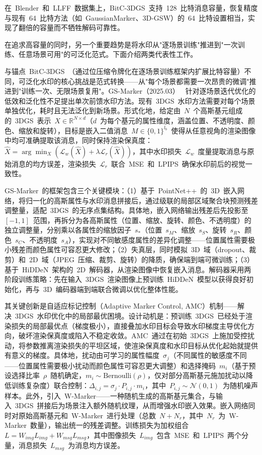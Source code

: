 在~Blender~和~LLFF~数据集上，BitC-3DGS~支持~128~比特消息容量，恢复精度与现有~64~比特方法（如~GaussianMarker、3D-GSW）的~64~比特设置相当，实现了翻倍的容量而不牺牲解码可靠性。

在追求高容量的同时，另一个重要趋势是将水印从"逐场景训练"推进到"一次训练、任意场景可用"的可泛化范式。下面介绍两类代表性工作。

与锚点~BitC-3DGS~（通过位压缩令牌化在逐场景训练框架内扩展比特容量）不同，可泛化水印的核心挑战是范式转换——从"每个场景都需要一次昂贵的微调"推进到"训练一次、无限场景复用"。GS-Marker（2025.03）~\cite{2503_18718} 针对逐场景迭代优化的低效和泛化性不足提出单次前馈水印方法。现有~3DGS~水印方法需要对每个场景单独优化，耗时且无法泛化到新场景。形式化地，给定由~$N$~个高斯基元组成的~3DGS~表示~$X \in \mathbb{R}^{N \times d}$（$d$~为每个基元的属性维度，涵盖位置、不透明度、颜色、缩放和旋转），目标是嵌入二值消息~$M \in \{0,1\}^{l_b}$~使得从任意视角的渲染图像中均可准确提取该消息，同时保持渲染保真度：$\hat{X} = \arg\min_{X} (\mathcal{L}_w(\hat{X}) + \lambda \mathcal{L}_r(\hat{X}))$，其中水印损失~$\mathcal{L}_w$~度量提取消息与原始消息的均方误差，渲染损失~$\mathcal{L}_r$~联合~MSE~和~LPIPS~确保水印前后的视觉一致性。

GS-Marker~的框架包含三个关键模块：（1）基于~PointNet++~的~3D~嵌入网络，将归一化的高斯属性与水印消息拼接后，通过级联的局部区域聚合块预测残差调整量，适配~3DGS~的无序点集结构。具体地，嵌入网络输出残差后先投影至~$[-1, 1]$~范围，再拆分为各高斯属性（位置、缩放、旋转、颜色、不透明度）的独立调整量，分别乘以各属性的缩放因子~$s_*$（位置~$s_M$、缩放~$s_S$、旋转~$s_R$、颜色~$s_C$、不透明度~$s_A$），实现对不同敏感度属性的差异化调整——位置属性需要极小残差而颜色属性可容忍更大修改；（2）失真层，同时模拟~3D~域（dropout、裁剪）和~2D~域（JPEG~压缩、裁剪、旋转）的降质，确保端到端可微训练；（3）基于~HiDDeN~架构的~2D~解码器，从渲染图像中恢复嵌入消息。解码器采用两阶段训练策略：先在输入~3DGS~渲染图像上预训练~HiDDeN~模型以获得良好初始化，再与~3D~编码器端到端联合微调以优化整体性能。

其关键创新是自适应标记控制（Adaptive Marker Control, AMC）机制——解决~3DGS~水印优化中的局部最优困境。设计动机是：预训练~3DGS~已经处于渲染损失的局部最优点（梯度极小），直接叠加水印目标会导致水印梯度主导优化方向，破坏渲染保真度或陷入不稳定收敛。AMC~通过在初始~3DGS~上施加受控扰动，将参数推离渲染损失的平坦区域，使渲染保真度和水印目标从优化起始就提供有意义的梯度。具体地，扰动由可学习的属性幅度~$\sigma_j$（不同属性的敏感度不同——位置属性需要极小扰动而颜色属性可容忍更大调整）和选择掩码~$m_i$（基于预设选择比率~$\rho$~随机确定，$m_i \sim \text{Bernoulli}(\rho)$，仅对部分高斯基元施加扰动以降低训练复杂度）联合控制：$\Delta_{i,j} = \sigma_j \cdot P_{i,j} \cdot m_i$，其中~$P_{i,j} \sim \mathcal{N}(0, 1)$~为随机噪声样本。此外，引入~W-Marker——一种随机生成的高斯基元集合，与输入~3DGS~拼接后为场景注入额外随机纹理，从而增强水印嵌入效果。嵌入网络同时对原始高斯基元和~W-Marker~进行处理（总数~$N + N_r$，其中~$N_r$~为~W-Marker~数量），输出统一的残差调整。训练损失为加权组合~$L = W_{img} L_{img} + W_{msg} L_{msg}$，其中图像损失~$L_{img}$~包含~MSE~和~LPIPS~两个分量，消息损失~$L_{msg}$~为消息均方误差。

